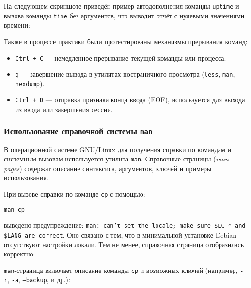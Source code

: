 На следующем скриншоте приведён пример автодополнения команды \texttt{uptime} и вызова команды \texttt{time} без аргументов, что выводит отчёт с нулевыми значениями времени:


Также в процессе практики были протестированы механизмы прерывания команд:

\begin{itemize}
    \item \texttt{Ctrl + C} --- немедленное прерывание текущей команды или процесса.
    \item \texttt{q} --- завершение вывода в утилитах постраничного просмотра (\texttt{less}, \texttt{man}, \texttt{hexdump}).
    \item \texttt{Ctrl + D} --- отправка признака конца ввода (EOF), используется для выхода из ввода или завершения сессии.
\end{itemize}

\subsubsection*{Использование справочной системы \texttt{man}}

В операционной системе GNU/Linux для получения справки по командам и системным вызовам используется утилита \texttt{man}. Справочные страницы (\textit{man pages}) содержат описание синтаксиса, аргументов, ключей и примеры использования.

При вызове справки по команде \texttt{cp} с помощью:

\begin{verbatim}
man cp
\end{verbatim}

 выведено предупреждение:
\texttt{man: can't set the locale; make sure \$LC\_* and \$LANG are correct}.
Оно связано с тем, что в минимальной установке Debian отсутствуют настройки локали. Тем не менее, справочная страница отобразилась корректно:


\texttt{man}-страница включает описание команды \texttt{cp} и возможных ключей (например, \texttt{-r}, \texttt{-a}, \texttt{--backup}, и др.):


